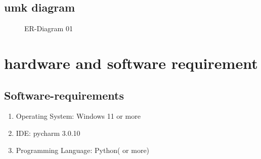 \documentclass[oneside,a4paper,12pt]{report}
\begin{document}
\section{umk diagram}
\begin{center}
\begin{figure}[!htbp]
\caption{ER-Diagram 01}
\end{figure}
\chapter{hardware and software requirement}
\section{Software-requirements}
\begin{enumerate}
\item Operating System: Windows 11 or more
\item IDE: pycharm 3.0.10
\item Programming Language: Python( or more)
\end{enumerate}
\begin{enumerate}

\end{enumerate}
\end{center}
\end{document}
